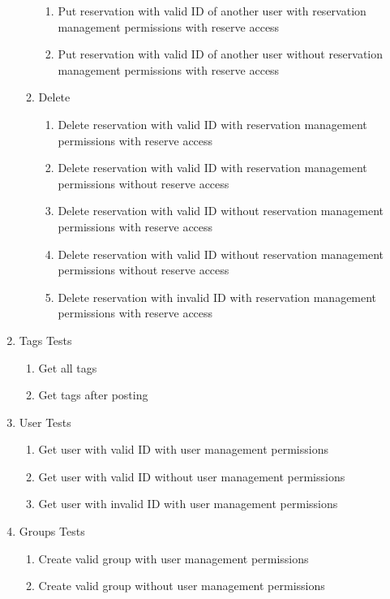 \documentclass[12pt]{article}
\begin{document}
\begin{enumerate}
\begin{enumerate}
\begin{enumerate}
            \item Put reservation with valid ID of another user with reservation management permissions with reserve access
            \item Put reservation with valid ID of another user without reservation management permissions with reserve access     
        \end{enumerate}
        \item Delete
        \begin{enumerate}
            \item Delete reservation with valid ID with reservation management permissions with reserve access
            \item Delete reservation with valid ID with reservation management permissions without reserve access
            \item Delete reservation with valid ID without reservation management permissions with reserve access
            \item Delete reservation with valid ID without reservation management permissions without reserve access
            \item Delete reservation with invalid ID with reservation management permissions with reserve access    
        \end{enumerate}
    \end{enumerate}
    \item Tags Tests
    \begin{enumerate}
        \item Get all tags
        \item Get tags after posting
    \end{enumerate}
    \item User Tests
    \begin{enumerate}
        \item Get user with valid ID with user management permissions
        \item Get user with valid ID without user management permissions
        \item Get user with invalid ID with user management permissions
    \end{enumerate}
    \item Groups Tests
    \begin{enumerate}
        \item Create valid group with user management permissions
        \item Create valid group without user management permissions

\end{enumerate}
\end{enumerate}
\end{document}
